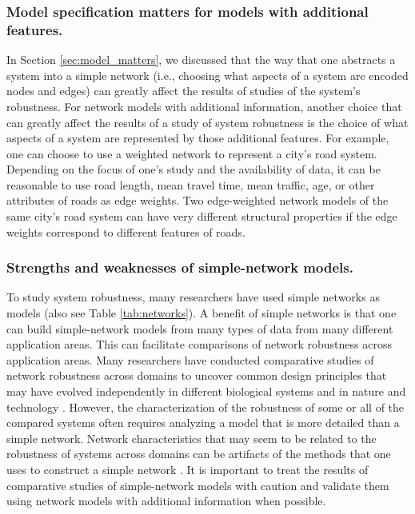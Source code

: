 \documentclass{comnet-mod}
\begin{document}
\subsubsection{Model specification matters for models with additional features.}

In Section \ref{sec:model_matters}, we discussed that the way that one abstracts a system into a simple network (i.e., choosing what aspects of a system are encoded nodes and edges) can greatly affect the results of studies of the system's robustness. For network models with additional information, another choice that can greatly affect the results of a study of system robustness is the choice of what aspects of a system are represented by those additional features. For example, one can choose to use a weighted network to represent a city's road system. Depending on the focus of one's study and the availability of data, it can be reasonable to use road length, mean travel time, mean traffic, age, or other attributes of roads as edge weights. Two edge-weighted network models of the same city's road system can have very different structural properties if the edge weights correspond to different features of roads.


\subsubsection{Strengths and weaknesses of simple-network models.} 

To study system robustness, many researchers have used simple networks as models \cite{Albert2000, Callaway2000, Iyer2013, Ventresca2014} (also see Table \ref{tab:networks}). A benefit of simple networks is that one can build simple-network models from many types of data from many different application areas. This can facilitate comparisons of network robustness across application areas. 
Many researchers have conducted comparative studies of network robustness across domains to uncover common design principles \cite{Sole2002, Demetrius2005, Wang2008, Wang2012a, Shimada2014} that may have evolved independently in different biological systems \cite{Hintze2008, Zhang2016a} and in nature and technology \cite{Iyer2013, Ventresca2014}. However, the characterization of the robustness of some or all of the compared systems often requires analyzing a model that is more detailed than a simple network. Network characteristics that may seem to be related to the robustness of systems across domains can be artifacts of the methods that one uses to construct a simple network \cite{Cantwell2020}. It is important to treat the results of  comparative studies of simple-network models with caution and validate them using network models with additional information when possible.
\end{document}
